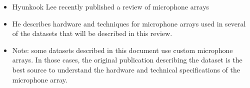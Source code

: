 \documentclass[14pt, legalpaper]{extarticle}
\begin{document}
\begin{itemize}

\item Hyunkook Lee recently published a review of microphone arrays \cite{lee2021multichannel}
	
\item He describes hardware and techniques for microphone arrays used in several of the datasets that will be described in this review. 

\item Note: some datasets described in this document use custom microphone arrays. In those cases, the original publication describing the dataset is the best source to understand the hardware and technical specifications of the microphone array.

\end{itemize}
\end{document}

